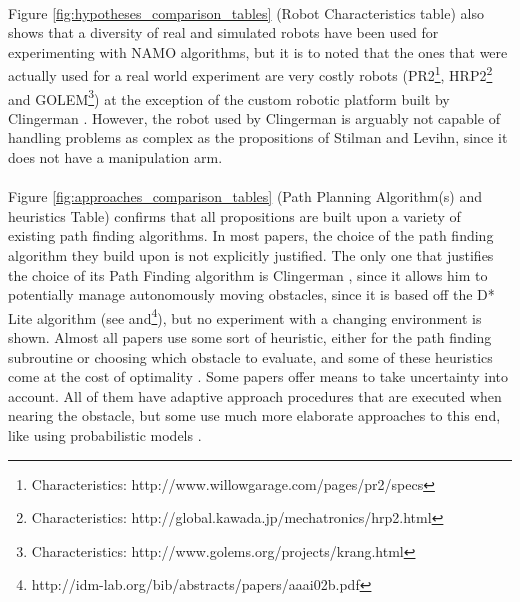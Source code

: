\paragraph{} Figure \ref{fig:hypotheses_comparison_tables} (Robot Characteristics table) also shows that a diversity of real and simulated robots have been used for experimenting with NAMO algorithms, but it is to noted that the ones that were actually used for a real world experiment are very costly robots (PR2\footnote{Characteristics: http://www.willowgarage.com/pages/pr2/specs}, HRP2\footnote{Characteristics: http://global.kawada.jp/mechatronics/hrp2.html} and GOLEM\footnote{Characteristics: http://www.golems.org/projects/krang.html}) at the exception of the custom robotic platform built by Clingerman \parencite{clingerman_estimating_2014}. However, the robot used by Clingerman is arguably not capable of handling problems as complex as the propositions of Stilman and Levihn, since it does not have a manipulation arm.

\paragraph{} Figure \ref{fig:approaches_comparison_tables} (Path Planning Algorithm(s) and heuristics Table) confirms that all propositions are built upon a variety of existing path finding algorithms. In most papers, the choice of the path finding algorithm they build upon is not explicitly justified. The only one that justifies the choice of its Path Finding algorithm is Clingerman \parencite{clingerman_dynamic_2015}, since it allows him to potentially manage autonomously moving obstacles, since it is based off the D* Lite algorithm (see \parencite{koenig_fast_2005} and\footnote{http://idm-lab.org/bib/abstracts/papers/aaai02b.pdf}), but no experiment with a changing environment is shown. Almost all papers use some sort of heuristic, either for the path finding subroutine or choosing which obstacle to evaluate, and some of these heuristics come at the cost of optimality \parencite{stilman_navigation_2005, wu_navigation_2010}. Some papers \parencite{stilman_planning_2007, levihn_foresight_2013, levihn_planning_2013, clingerman_estimating_2014, clingerman_dynamic_2015, scholz_navigation_2016} offer means to take uncertainty into account. All of them have adaptive approach procedures that are executed when nearing the obstacle, but some use much more elaborate approaches to this end, like using probabilistic models \parencite{levihn_planning_2013, scholz_navigation_2016}.

